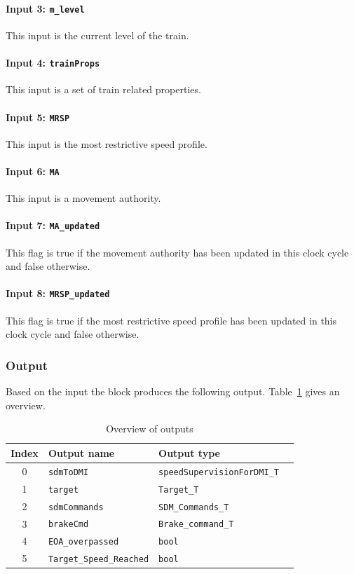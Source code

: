 \paragraph{Input 3: \texttt{m\_level}}
This input is the current level of the train.
\paragraph{Input 4: \texttt{trainProps}}
This input is a set of train related properties.
\paragraph{Input 5: \texttt{MRSP}}
This input is the most restrictive speed profile.
\paragraph{Input 6: \texttt{MA}}
This input is a movement authority.
\paragraph{Input 7: \texttt{MA\_updated}}
This flag is true if the movement authority has been updated in this clock cycle and false otherwise.
\paragraph{Input 8: \texttt{MRSP\_updated}}
This flag is true if the most restrictive speed profile has been updated in this clock cycle and false otherwise.



\subsubsection{Output}
Based on the input the block produces the following output. Table~\ref{tbl:speedsupervisionOutput} gives an overview.

\begin{table}[H]
  \begin{tabular}{| c | l | l | l |}
    \hline
    \textbf{Index} & \textbf{Output name} & \textbf{Output type}\\ \hline
    0 & \texttt{sdmToDMI} & \texttt{speedSupervisionForDMI\_T}\\
    1 & \texttt{target} & \texttt{Target\_T}\\
    2 & \texttt{sdmCommands} & \texttt{SDM\_Commands\_T}\\
    3 & \texttt{brakeCmd} & \texttt{Brake\_command\_T}\\
    4 & \texttt{EOA\_overpassed} & \texttt{bool}\\
    5 & \texttt{Target\_Speed\_Reached} & \texttt{bool}\\
    \hline
  \end{tabular} 
  \caption{Overview of outputs}
  \label{tbl:speedsupervisionOutput}
\end{table}

